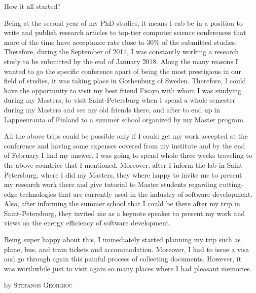 \documentclass[10pt,a4paper]{article} %
\newcommand{\NewsItem}[1]{ %
\usefont{T1}{fvs}{n}{n} %
\vspace{24pt}\large #1\vspace{3pt} %
\par \normalsize \normalfont}
\newcommand{\NewsAuthor}[1]{ %
\hfill by \textsc{#1} \vspace{20pt} %
\par \normalfont}
\begin{document}
\begin{multicols}{3} %


\NewsItem{How it all started?}
Being at the second year of my PhD studies, it means I cab be in a position to write
and publish research articles to top-tier computer science conferences that more of the time
have acceptance rate close to 30\% of the submitted studies.
Therefore, during the September of 2017, I was constantly working a research study
to be submitted by the end of January 2018.
Along the many reasons I wanted to go the specific conference apart of being the most
prestigious in our field of studies, it was taking place in Gothenburg of Sweden.
Therefore, I could have the opportunity to visit my best friend Fisayo with whom I was
studying during my Masters, to visit Saint-Petersburg when I spend a whole semester
during my Masters and see my old friends there, and after to end up in Lappeenranta
of Finland to a summer school organized by my Master program.

All the above trips could be possible only if I could get my work accepted at the conference
and having some expenses covered from my institute and by the end of February I had my answer.
I was going to spend whole three weeks traveling to the above countries that I mentioned.
Moreover, after I inform the lab in Saint-Petersburg, where I did my Masters, they where
happy to invite me to present my research work there and give tutorial to Master students
regarding cutting-edge technologies that are currently used in the industry of software development.
Also, after informing the summer school that I could be there after my trip in Saint-Petersburg,
they invited me as a keynote speaker to present my work and views on the energy efficiency
of software development.

Being super happy about this, I immediately started planning my trip such as plane, bus, and
train tickets and accommodation.
Moreover, I had to issue a visa and go through again this painful process of collecting documents.
However, it was worthwhile just to visit again so many places where I had pleasant memories.


\NewsAuthor{Stefanos Georgiou}\begin{flushleft}
	

\end{flushleft}
\end{multicols}
\end{document}
